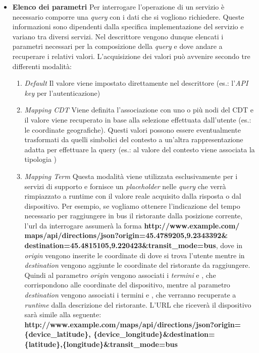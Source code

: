 \begin{itemize}
	\item \textbf{Elenco dei parametri}
	Per interrogare l'operazione di un servizio è necessario comporre una \emph{query} con i dati che si vogliono richiedere. Queste informazioni sono dipendenti dalla specifica implementazione del servizio e variano tra diversi servizi. Nel descrittore vengono dunque elencati i parametri necessari per la composizione della \emph{query} e dove andare a recuperare i relativi valori. L'acquisizione dei valori può avvenire secondo tre differenti modalità:
	\begin{enumerate}
		\item \emph{Default}
		Il valore viene impostato direttamente nel descrittore (es.: l'\emph{API key} per l'autenticazione)
		\item \emph{Mapping CDT}
		Viene definita l'associazione con uno o più nodi del CDT e il valore viene recuperato in base alla selezione effettuata dall'utente (es.: le coordinate geografiche). Questi valori possono essere eventualmente trasformati da quelli simbolici del contesto a un'altra rappresentazione adatta per effettuare la query (es.: al valore  del contesto viene associata la tipologia )
		\item \emph{Mapping Term}
		Questa modalità viene utilizzata esclusivamente per i servizi di supporto e fornisce un \emph{placeholder} nelle \emph{query} che verrà rimpiazzato a runtime con il valore reale acquisito dalla risposta o dal dispositivo. Per esempio, se vogliamo ottenere l'indicazione del tempo necessario per raggiungere in bus il ristorante  dalla posizione corrente, l'url da interrogare assumerà la forma \textbf{http://www.example.com/\\maps/api/directions/json?origin=45.4789205,9.2343392\&\\destination=45.4815105,9.220423\&transit\_mode=bus}, dove in \emph{origin} vengono inserite le coordinate di dove si trova l'utente mentre in \emph{destination} vengono aggiunte le coordinate del ristorante da raggiungere. Quindi al parametro \emph{origin} vengono associati i \emph{termini}  e , che corrispondono alle coordinate del dispositivo, mentre al parametro \emph{destination} vengono associati i termini  e , che verranno recuperate a \emph{runtime} dalla descrizione del ristorante. L'URL che riceverà il dispositivo sarà simile alla seguente: \textbf{http://www.example.com/maps/api/directions/json?origin=\\\{device\_latitude\}, \{device\_longitude\}\&destination=\\\{latitude\},\{longitude\}\&transit\_mode=bus}

\end{enumerate}
\end{itemize}
